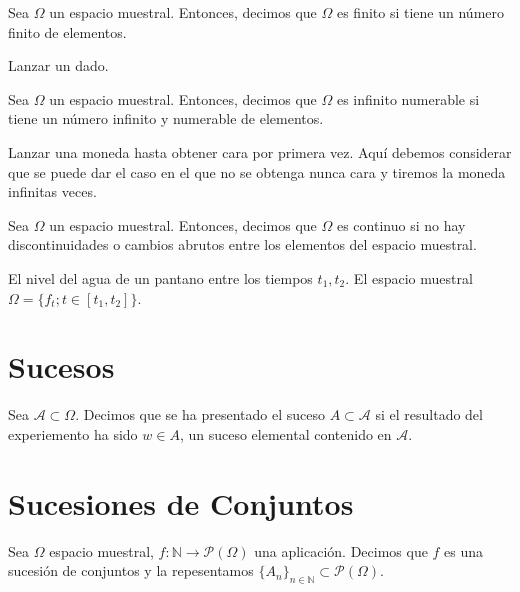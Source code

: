 \begin{defn}
  Sea $\Omega$ un espacio muestral. Entonces, decimos que $\Omega$ es finito si tiene un número finito de elementos.
\end{defn}

\begin{ejm}
  Lanzar un dado.
\end{ejm}

\begin{defn}
  Sea $\Omega$ un espacio muestral. Entonces, decimos que $\Omega$ es infinito numerable si tiene un número infinito y numerable de elementos.
\end{defn}

\begin{ejm}
  Lanzar una moneda hasta obtener cara por primera vez. Aquí debemos considerar que se puede dar el caso en el que no se obtenga nunca cara y tiremos la moneda infinitas veces.
\end{ejm}

\begin{defn}
  Sea $\Omega$ un espacio muestral. Entonces, decimos que $\Omega$ es continuo si no hay discontinuidades o cambios abrutos entre los elementos del espacio muestral.
\end{defn}

\begin{ejm}
  El nivel del agua de un pantano entre los tiempos $t_{1}, t_{2}$. El espacio muestral $\Omega = \{  f_{t} ; t \in [t_{1}, t_{2}] \}$.
\end{ejm}

\section{Sucesos}

\begin{note}
  Sea $\mathcal{A} \subset \Omega$. Decimos que se ha presentado el suceso $A \subset \mathcal{A}$ si el resultado del experiemento ha sido $w \in A$, un suceso elemental contenido en $\mathcal{A}$.
\end{note}

\section{Sucesiones de Conjuntos}

\begin{defn}
  Sea $\Omega$ espacio muestral, $f: \mathbb{N} \to \mathcal{P}(\Omega)$ una aplicación. Decimos que $f$ es una sucesión de conjuntos y la repesentamos $\{ A_{n} \}_{n \in \mathbb{N}} \subset \mathcal{P}(\Omega)$.
\end{defn}

